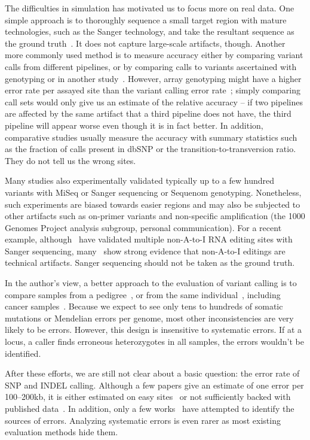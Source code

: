 \documentclass{bioinfo}
\begin{document}
The difficulties in simulation has motivated us to focus more on real data. One
simple approach is to thoroughly sequence a small target region with mature
technologies, such as the Sanger technology, and take the resultant sequence as
the ground truth~\citep{Harismendy:2009aa}. It does not capture large-scale
artifacts, though. Another more commonly used method is to measure accuracy
either by comparing variant calls from different pipelines, or by comparing
calls to variants ascertained with genotyping or in another
study~\citep{Clark:2011aa,Li:2012fk,Lam:2012aa,Lam:2012fk,Boland:2013aa,Liu:2013aa,Goode:2013aa,ORawe:2013aa,Zook:2014aa}.
However, array genotyping might have a higher error rate per assayed site than
the variant calling error rate~\citep{Bentley:2008cr}; simply comparing call
sets would only give us an estimate of the relative accuracy -- if two
pipelines are affected by the same artifact that a third pipeline does
not have, the third pipeline will appear worse even though it is in fact
better.  In addition, comparative studies usually measure the accuracy with
summary statistics such as the fraction of calls present in dbSNP or the
transition-to-transversion ratio.  They do not tell us the wrong sites.

Many studies also experimentally validated typically up to a few hundred
variants with MiSeq or Sanger sequencing or Sequenom genotyping. Nonetheless,
such experiments are biased towards easier regions and may also be subjected
to other artifacts such as on-primer variants and non-specific amplification
(the 1000 Genomes Project analysis subgroup, personal communication). For a
recent example, although~\citet{Li:2011ac} have validated multiple non-A-to-I
RNA editing sites with Sanger sequencing, many~\citep{Pickrell:2012aa} show
strong evidence that non-A-to-I editings are technical artifacts. Sanger
sequencing should not be taken as the ground truth.

In the author's view, a better approach to the evaluation of variant calling is
to compare samples from a pedigree~\citep{Zook:2014aa}, or from the same
individual~\citep{Nickles:2012aa}, including cancer
samples~\citep{Lower:2012aa}. Because we expect to see only tens to hundreds of
somatic mutations or Mendelian errors per genome, most other inconsistencies
are very likely to be errors. However, this design is insensitive to systematic
errors.  If at a locus, a caller finds erroneous heterozygotes in all samples,
the errors wouldn't be identified.

After these efforts, we are still not clear about a basic question: the error
rate of SNP and INDEL calling. Although a few papers give an estimate of one
error per 100--200kb, it is either estimated on easy
sites~\citep{Bentley:2008cr} or not sufficiently backed with published
data~\citep{Nickles:2012aa}. In addition, only a few
works~\citep{Larson:2012aa,Roberts:2013aa,Kim:2013aa} have attempted to
identify the sources of errors. Analyzing systematic errors is even rarer as
most existing evaluation methods hide them.
\end{document}
